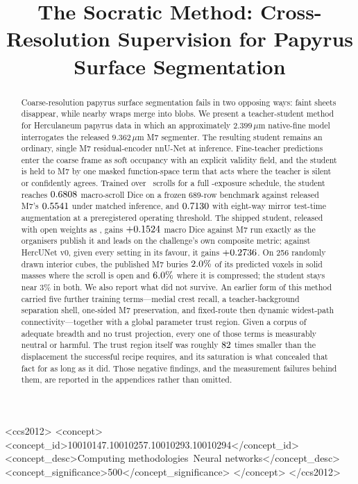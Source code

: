 \documentclass[acmtog,review,anonymous]{acmart}
\begin{document}
\title{The Socratic Method: Cross-Resolution Supervision for Papyrus Surface Segmentation}

\begin{abstract}
Coarse-resolution papyrus surface segmentation fails in two opposing ways:
faint sheets disappear, while nearby wraps merge into blobs.
We present a teacher-student method for Herculaneum papyrus data in which an
approximately $2.399\,\mu$m native-fine model interrogates the released
$9.362\,\mu$m M7 segmenter.
The resulting student remains an ordinary, single M7 residual-encoder nnU-Net
at inference.
Fine-teacher predictions enter the coarse frame as soft occupancy with an
explicit validity field, and the student is held to M7 by one masked
function-space term that acts where the teacher is silent or confidently
agrees.
Trained over \corpusScrolls\ scrolls for a full \fzHorizon-exposure schedule,
the student reaches $0.6808$ macro-scroll Dice on a frozen 689-row benchmark
against released M7's $0.5541$ under matched inference, and $0.7130$
with eight-way mirror test-time augmentation at a preregistered operating
threshold.
The shipped student, released with open weights as \releaseName, gains
$+0.1524$ macro Dice against M7 run exactly as the organisers
publish it and leads on the challenge's own composite metric; against HercUNet
v0, given every setting in its favour, it gains $+0.2736$.
On 256 randomly drawn interior cubes, the published M7 buries
$2.0\%$ of its predicted voxels in solid masses where the scroll
is open and $6.0\%$ where it is compressed; the student stays
near $3\%$ in both.
We also report what did not survive.
An earlier form of this method carried five further training terms---medial
crest recall, a teacher-background separation shell, one-sided M7 preservation,
and fixed-route then dynamic widest-path connectivity---together with a global
parameter trust region.
Given a corpus of adequate breadth and no trust projection, every one of those
terms is measurably neutral or harmful.
The trust region itself was roughly $82$ times smaller than the
displacement the successful recipe requires, and its saturation is what
concealed that fact for as long as it did.
Those negative findings, and the measurement failures behind them, are reported
in the appendices rather than omitted.
\end{abstract}

\begin{CCSXML}
<ccs2012>
 <concept>
  <concept_id>10010147.10010257.10010293.10010294</concept_id>
  <concept_desc>Computing methodologies~Neural networks</concept_desc>
  <concept_significance>500</concept_significance>
 </concept>
</ccs2012>
\end{CCSXML}
\end{document}

